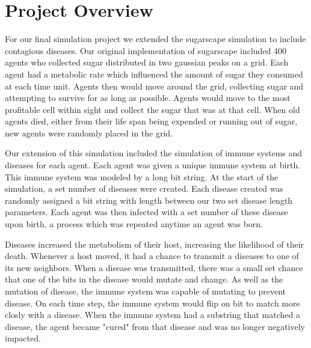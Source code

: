 \documentclass[12pt,a4paper]{article} %
\begin{document}
    \title{\rmfamily\normalfont{}}
    \author{}
    \date{} %
    
    \maketitle
    
    
    \section{Project Overview}
    For our final simulation project we extended the sugarscape simulation to include contagious diseases. Our original implementation of sugarscape included 400 agents who collected sugar distributed in two gaussian peaks on a grid. Each agent had a metabolic rate which influenced the amount of sugar they consumed at each time unit. Agents then would move around the grid, collecting sugar and attempting to survive for as long as possible. Agents would move to the most profitable cell within sight and collect the sugar that was at that cell. When old agents died, either from their life span being expended or running out of sugar, new agents were randomly placed in the grid.
    
    Our extension of this simulation included the simulation of immune systems and diseases for each agent. Each agent was given a unique immune system at birth. This immune system was modeled by a long bit string. At the start of the simulation, a set number of diseases were created. Each disease created was randomly assigned a bit string with length between our two set disease length parameters. Each agent was then infected with a set number of these disease upon birth, a process which was repeated anytime an agent was born. 
    
    Diseases increased the metabolism of their host, increasing the likelihood of their death. Whenever a host moved, it had a chance to transmit a diseases to one of its new neighbors. When a disease was transmitted, there was a small set chance that one of the bits in the disease would mutate and change. As well as the mutation of disease, the immune system was capable of mutating to prevent disease. On each time step, the immune system would flip on bit to match more closly with a disease. When the immune system had a substring that matched a disease, the agent became "cured" from that disease and was no longer negatively impacted.
    
\end{document}
